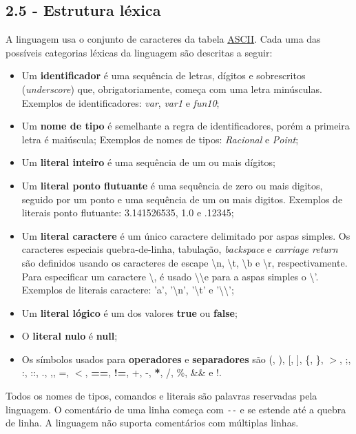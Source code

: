 \documentclass[a4paper,11pt]{article}
\begin{document}
\subsection*{2.5 - Estrutura léxica}
\label{sec:orgcdb8a10}

A linguagem usa o conjunto de caracteres da tabela \href{http://www.asciitable.com}{ASCII}. Cada uma das possíveis categorias léxicas da linguagem são
descritas a seguir:

\begin{itemize}
\item Um \textbf{identificador} é uma sequência de letras, dígitos e sobrescritos (\emph{underscore}) que, obrigatoriamente,
começa com uma letra minúsculas. Exemplos de identificadores: \emph{var}, \emph{var1} e \emph{fun10};
\item Um \textbf{nome de tipo} é semelhante a regra de identificadores, porém a primeira letra é maiúscula;
Exemplos de nomes de tipos: \emph{Racional} e \emph{Point};
\item Um \textbf{literal inteiro} é uma sequência de um ou mais dígitos;
\item Um \textbf{literal ponto flutuante} é uma sequência de zero ou mais digitos, seguido por um ponto e uma sequência
de um ou mais digitos. Exemplos de literais ponto flutuante: 3.141526535, 1.0 e .12345;
\item Um \textbf{literal caractere} é um único caractere delimitado por aspas simples.
Os caracteres especiais quebra-de-linha, tabulação, \emph{backspace} e \emph{carriage return} são definidos usando os
caracteres de escape \textbackslash n, \textbackslash t, \textbackslash b e \textbackslash r, respectivamente.
Para especificar um caractere \textbackslash, é usado \textbackslash\textbackslash e para a aspas simples o
\textbackslash'. Exemplos de literais caractere: 'a', '\textbackslash n', '\textbackslash t' e '\textbackslash\textbackslash';
\item Um \textbf{literal lógico} é um dos valores \textbf{true} ou \textbf{false};
\item O \textbf{literal nulo} é \textbf{null};
\item Os símbolos usados para \textbf{operadores} e \textbf{separadores} são (, ), [, ], \{, \}, \(>\), ;, :, ::, ., ,, =, \(<\),
\textbf{==}, \textbf{!=}, +, -, \textbf{*}, /, \%, \&\& e !.
\end{itemize}

Todos os nomes de tipos, comandos e literais são palavras reservadas pela linguagem.
O comentário de uma linha começa com \texttt{-{}-{}} e se estende até a quebra de linha.
A linguagem não suporta comentários com múltiplas linhas.
\end{document}

